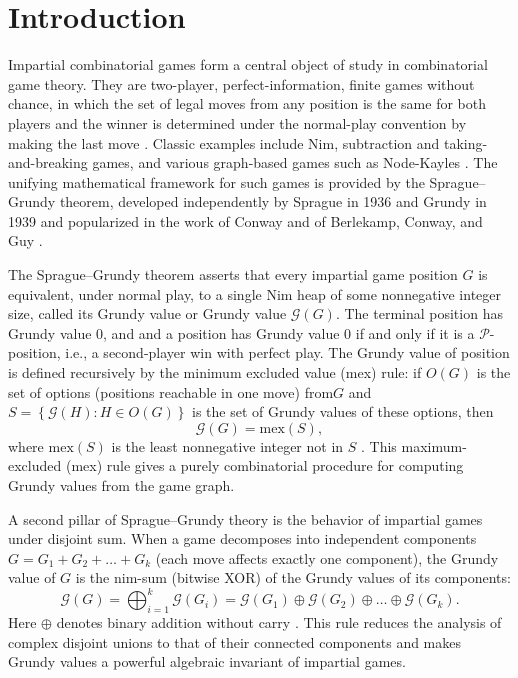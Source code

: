 \documentclass[12pt]{elsarticle}
\newtheorem*{theorem A}{Theorem A}
\newtheorem*{theorem B}{N\"olker's Theorem}
\theoremstyle{remark}
\theoremstyle{remark}
\theoremstyle{definition}
\begin{document}
\section{Introduction}
Impartial combinatorial games form a central object of study in combinatorial game theory. They are two-player, perfect-information, finite games without chance, in which the set of legal moves from any position is the same for both players and the winner is determined under the normal-play convention by making the last move \cite{brown2020nimber, conway2000numbers, berlekamp2001winning}. Classic examples include Nim, subtraction and taking-and-breaking games, and various graph-based games such as Node-Kayles \cite{brown2020nimber, berlekamp2001winning,albert2019lessons}. The unifying mathematical framework for such games is provided by the Sprague–Grundy theorem, developed independently by Sprague \cite{sprague1935mathematische} in 1936 and Grundy \cite{grundy1939mathematics} in 1939 and popularized in the work of Conway and of Berlekamp, Conway, and Guy \cite{conway2000numbers, berlekamp2001winning}.

The Sprague–Grundy theorem asserts that every impartial game position $G$ is equivalent, under normal play, to a single Nim heap of some nonnegative integer size, called its Grundy value or Grundy value $\mathcal{G}(G)$. The terminal position has Grundy value $0$, and and a position has Grundy value
$0$ if and only if it is a $\mathcal{P}$-position, i.e., a second-player win with perfect play. The Grundy value of position is defined recursively by the minimum excluded value (mex) rule: if
$O(G)$ is the set of options (positions reachable in one move) from$G$ and $S = \left\{\mathcal{G}(H) : H \in O(G)\right\}$ is the set of Grundy values of these options, then
\begin{equation*}
	\mathcal{G}(G) = \mathrm{mex}(S),
\end{equation*}
where $\mathrm{mex}(S)$ is the least nonnegative integer not in $S$ \cite{brown2020nimber, bodlaender2002kayles}. This maximum-excluded (mex) rule gives a purely combinatorial procedure for computing Grundy values from the game graph.

A second pillar of Sprague–Grundy theory is the behavior of impartial games under disjoint sum. When a game decomposes into independent components $G = G_1 + G_2 + \dots + G_k$ (each move affects exactly one component), the Grundy value of $G$ is the nim-sum (bitwise XOR) of the Grundy values of its components:
\begin{equation*}
	\mathcal{G}(G) = \bigoplus_{i=1}^{k}\mathcal{G}(G_i) = \mathcal{G}(G_1) \oplus \mathcal{G}(G_2) \oplus \dots \oplus \mathcal{G}(G_k).
\end{equation*}
Here $\oplus$ denotes binary addition without carry \cite{brown2020nimber,albert2019lessons,bodlaender2002kayles}. This rule reduces the analysis of complex disjoint unions to that of their connected components and makes Grundy values a powerful algebraic invariant of impartial games.
\end{document}
